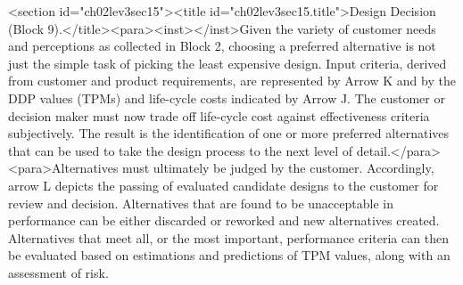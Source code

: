 <section id="ch02lev3sec15"><title id="ch02lev3sec15.title">Design Decision (Block 9).</title><para><inst></inst>Given the variety of customer needs and perceptions as collected in Block 2, choosing a preferred alternative is not just the simple task of picking the least expensive design. Input criteria, derived from customer and product requirements, are represented by Arrow K and by the DDP values (TPMs) and life-cycle costs indicated by Arrow J. The customer or decision maker must now trade off life-cycle cost against effectiveness criteria subjectively. The result is the identification of one or more preferred alternatives that can be used to take the design process to the next level of detail.</para>
<para>Alternatives must ultimately be judged by the customer. Accordingly, arrow L depicts the passing of evaluated candidate designs to the customer for review and decision. Alternatives that are found to be unacceptable in performance can be either discarded or reworked and new alternatives created. Alternatives that meet all, or the most important, performance criteria can then be evaluated based on estimations and predictions of TPM values, along with an assessment of risk.